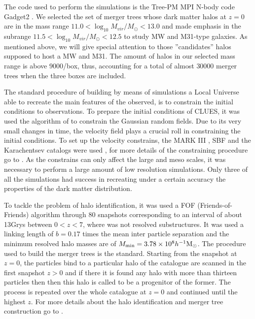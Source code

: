 \documentclass[usenatbib]{mn2e}
\newcommand{\hMsun}{{\ifmmode{h^{-1}{\rm {M_{\odot}}}}\else{$h^{-1}{\rm{M_{\odot}}}$}\fi}}
\begin{document}
The code used to perform the simulations is the Tree-PM MPI N-body
code Gadget2 \citep{2005MNRAS.364.1105S}. We selected  the set of
merger trees whose dark matter halos at $z=0$ are in the mass range
$11.0<\log_{10} M_{vir}/M_{\odot}<13.0$ and made  emphasis in the
subrange  $11.5<\log_{10} M_{vir}/M_{\odot}<12.5$ to study MW and
M31-type galaxies.  As mentioned above, we will give special attention
to those ''candidates'' halos  supposed to host a MW  and M31. The
amount of halos in our selected mass range  is above $9000$/box, thus,
accounting for a total of almost $30000$ merger trees when the three
boxes are included. 


The standard procedure of building by means of simulations a Local
Universe able to recreate the main features of the observed, is to
constrain the initial conditions to observations. To prepare the
initial conditions of CLUES, it was used the algorithm of
\cite{1991ApJ...380L...5H}   to constrain the Gaussian random
fields. Due to its very small changes in time, the velocity field
plays a crucial roll in constraining the initial conditions. To set up
the velocity constrains, the MARK   III \citep{1997ApJS..109..333W},
SBF \citep{2001ApJ...546..681T} and the Karachentsev
\citep{2004AJ....127.2031K} catalogs were used
\citep{2011arXiv1107.0017F}, for more details of the constraining
procedure go to \cite{2010arXiv1005.2687G}. As the constrains can only
affect the large and meso scales, it was necessary to  perform a large
amount of low resolution simulations. Only three of all the
simulations had success in recreating under a certain accuracy the
properties of the dark matter distribution. 


 To tackle the problem of halo identification, it was used a FOF
 (Friends-of-Friends) algorithm through 80 snapshots corresponding to
 an interval of about 13Grys between $0<z<7$,  where was not resolved
 substructures. It was used a linking length of $b=0.17$ times the
 mean inter particle separation and the minimum resolved halo masses
 are of  $M_{\text{min}}=3.78\times 10^8 \hMsun$. The procedure used
 to build the merger trees is the standard. Starting from the snapshot
 at $z=0$, the particles bind to a particular  halo of the catalogue
 are scanned in the first snapshot $z>0$  and if there it is found any
 halo with more than thirteen particles then then this halo is called
 to be a progenitor  of the former. The process is repeated over the
 whole catalogue at $z=0$ and continued until the highest $z$. For
 more details about the halo identification and merger tree
 construction go to \cite{2011arXiv1107.0017F}. 
 
\end{document}
